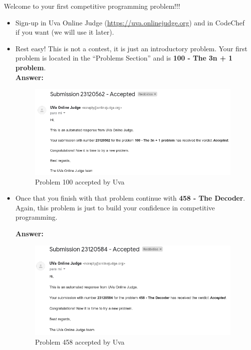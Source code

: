 \documentclass[12pt]{article}
\begin{document}
Welcome to your first competitive programming problem!!!

\begin{itemize}
    \item Sign-up in Uva Online Judge (\url{https://uva.onlinejudge.org}) and in CodeChef if you want (we will use it later).
    \item Rest easy! This is not a contest, it is just an introductory problem. Your first problem is located in the ``Problems Section'' and is \textbf{100 - The 3n + 1 problem}.\\

    \textbf{Answer: }\\
    

    \begin{figure}[H]
        \centering
        \includegraphics[scale=0.5]{p2/ss/p2_100.png}
        \caption{Problem 100 accepted by Uva}
        \label{p2_100}
    \end{figure}

    \item Once that you finish with that problem continue with \textbf{458 - The Decoder}. Again, this problem is just to build your confidence in competitive programming.

    \textbf{Answer: }\\
    
    \begin{figure}[H]
        \centering
        \includegraphics[scale=0.5]{p2/ss/p2_458.png}
        \caption{Problem 458 accepted by Uva}
        \label{p2_458}
    \end{figure}


\end{itemize}
\end{document}
